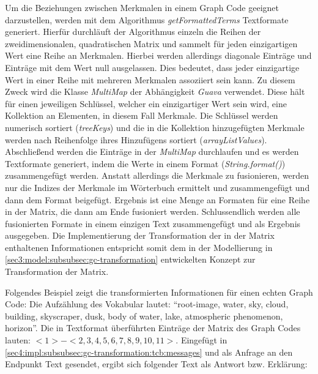 

Um die Beziehungen zwischen Merkmalen in einem Graph Code geeignet darzustellen, werden mit dem Algorithmus \textit{getFormattedTerms} Textformate generiert.
Hierfür durchläuft der Algorithmus einzeln die Reihen der zweidimensionalen, quadratischen Matrix und sammelt für jeden einzigartigen Wert eine Reihe an Merkmalen.
Hierbei werden allerdings diagonale Einträge und Einträge mit dem Wert null ausgelassen.
Dies bedeutet, dass jeder einzigartige Wert in einer Reihe mit mehreren Merkmalen assoziiert sein kann.
Zu diesem Zweck wird die Klasse \textit{MultiMap} der Abhängigkeit \textit{Guava} verwendet.
Diese hält für einen jeweiligen Schlüssel, welcher ein einzigartiger Wert sein wird, eine Kollektion an Elementen, in diesem Fall Merkmale.
Die Schlüssel werden numerisch sortiert (\textit{treeKeys}) und die in die Kollektion hinzugefügten Merkmale werden nach Reihenfolge ihres Hinzufügens sortiert (\textit{arrayListValues}).
Abschließend werden die Einträge in der \textit{MultiMap} durchlaufen und es werden Textformate generiert, indem die Werte in einem Format (\textit{String.format()}) zusammengefügt werden.
Anstatt allerdings die Merkmale zu fusionieren, werden nur die Indizes der Merkmale im Wörterbuch ermittelt und zusammengefügt und dann dem Format beigefügt.
Ergebnis ist eine Menge an Formaten für eine Reihe in der Matrix, die dann am Ende fusioniert werden.
Schlussendlich werden alle fusionierten Formate in einem einzigen Text zusammengefügt und als Ergebnis ausgegeben.
Die Implementierung der Transformation der in der Matrix enthaltenen Informationen entspricht somit dem in der Modellierung in \cref{sec3:model:subsubsec:gc-transformation} entwickelten Konzept zur Transformation der Matrix.

Folgendes Beispiel zeigt die transformierten Informationen für einen echten Graph Code:
Die Aufzählung des Vokabular lautet: \enquote{root-image, water, sky, cloud, building, skyscraper, dusk, body of water, lake, atmospheric phenomenon, horizon}.
Die in Textformat überführten Einträge der Matrix des Graph Codes lauten: $<1> - <2,3,4,5,6,7,8,9,10,11>$.
Eingefügt in \cref{sec4:impl:subsubsec:gc-transformation:tcb:messages} und als Anfrage an den Endpunkt Text gesendet, ergibt sich folgender Text als Antwort bzw. Erklärung:

